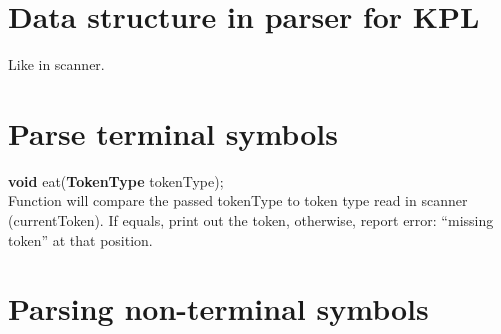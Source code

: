 \documentclass[12pt, a4paper]{report}
\begin{document}
		\section{Data structure in parser for KPL}
			\tab Like in scanner.
		\section{Parse terminal symbols}
			\textbf{void} eat(\textbf{TokenType} tokenType);\\
			Function will compare the passed tokenType to token type read in scanner (currentToken). If equals, print out the token, otherwise, report error: “missing token” at that position.
		\section{Parsing non-terminal symbols}
\end{document}
